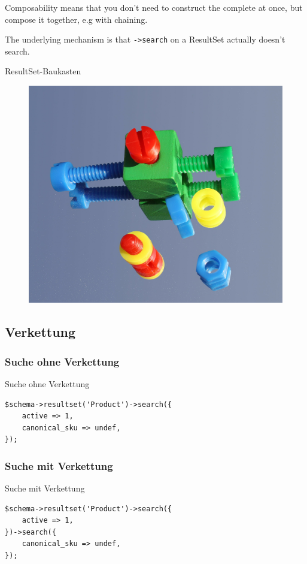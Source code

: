 Composability means that you don't need to construct the
complete at once, but compose it together, e.g with
chaining.

The underlying mechanism is that \verb|->search| on a
ResultSet actually doesn't search.


\begin{frame}{ResultSet-Baukasten}
\begin{figure}[!ht]
\centering
\includegraphics[width=0.70\linewidth]{img/baukasten.jpg}
\end{figure}
\end{frame}

\subsection{Verkettung}

\subsubsection{Suche ohne Verkettung}

\begin{frame}[fragile]{Suche ohne Verkettung}
\begin{lstlisting}
$schema->resultset('Product')->search({
    active => 1,
    canonical_sku => undef,
});
\end{lstlisting}
\end{frame}

\subsubsection{Suche mit Verkettung}

\begin{frame}[fragile]{Suche mit Verkettung}
\begin{lstlisting}
$schema->resultset('Product')->search({
    active => 1,
})->search({
    canonical_sku => undef,
});
\end{lstlisting}
\end{frame}

